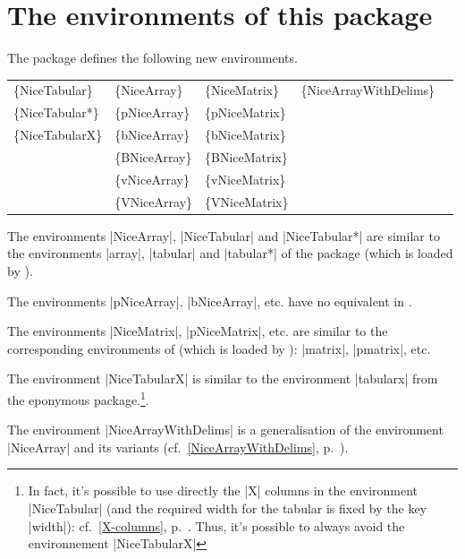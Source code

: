 \documentclass[dvipsnames]{article}
\begin{document}
\newpage

\tableofcontents


\newpage

\section{The environments of this package} 

The package  defines the following new environments.

\medskip
\begin{ttfamily}
\setlength{\tabcolsep}{3mm}
\begin{tabular}{lllll}
\{NiceTabular\}  & \{NiceArray\}  & \{NiceMatrix\}   & \{NiceArrayWithDelims\} \\
\{NiceTabular*\} & \{pNiceArray\} & \{pNiceMatrix\}  \\
\{NiceTabularX\} & \{bNiceArray\} & \{bNiceMatrix\}  \\
                 & \{BNiceArray\} & \{BNiceMatrix\}  \\
                 & \{vNiceArray\} & \{vNiceMatrix\}  \\
                 & \{VNiceArray\} & \{VNiceMatrix\}  
\end{tabular}
\end{ttfamily}

%
\medskip
The environments |{NiceArray}|, |{NiceTabular}| and |{NiceTabular*}| are
similar to the environments |{array}|, |{tabular}| and |{tabular*}| of the
package  (which is loaded by ).

\medskip
The environments |{pNiceArray}|, |{bNiceArray}|, etc. have no equivalent in
. 

\medskip
The environments |{NiceMatrix}|, |{pNiceMatrix}|, etc. are similar to the
corresponding environments of  (which is loaded by
): |{matrix}|, |{pmatrix}|, etc. 

\medskip
The environment |{NiceTabularX}| is similar to the environment |{tabularx}| from
the eponymous package.\footnote{In fact, it's possible to use directly the |X|
  columns in the environment |{NiceTabular}| (and the required width for the
  tabular is fixed by the key |width|): cf.~\ref{X-columns},
  p.~\pageref{X-columns}. Thus, it's possible to always avoid the environnement |{NiceTabularX}|}.

\medskip
The environment |{NiceArrayWithDelims}| is a generalisation of the environment
|{NiceArray}| and its variants (cf.~\ref{NiceArrayWithDelims}, p.~\pageref{NiceArrayWithDelims}).
\end{document}
